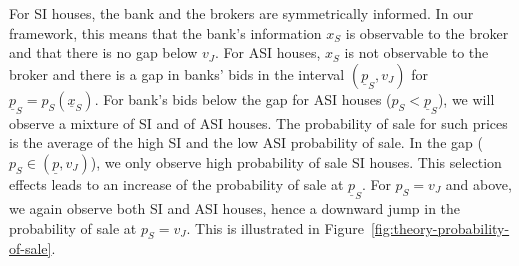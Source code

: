 \documentclass[11pt,twopage]{article}
\newcommand{\ul}{\underline}
\begin{document}
For SI houses, the bank and the brokers are symmetrically informed. In
our framework, this means that the bank's information $x_S$ is
observable to the broker and that there is no gap below $v_J$. For ASI
houses, $x_S$ is not observable to the broker and there is a gap in
banks' bids in the interval $(\ul p_S,v_J)$ for $\ul p_S=p_S(\ul
x_S)$. For bank's bids below the gap for ASI houses ($p_S<\ul p_S$),
we will observe a mixture of SI and of ASI houses. The probability of
sale for such prices is the average of the high SI and the low ASI
probability of sale. In the gap ($p_S\in(\ul p,v_J)$), we only observe
high probability of sale SI houses. This selection effects leads to an
increase of the probability of sale at $\ul p_S$. For $p_S=v_J$ and
above, we again observe both SI and ASI houses, hence a downward jump
in the probability of sale at $p_S=v_J$.
%
This is illustrated in Figure~\ref{fig:theory-probability-of-sale}.
\end{document}
